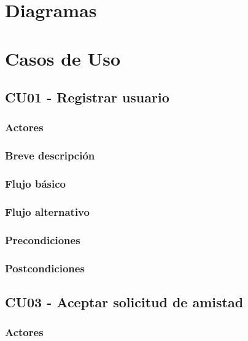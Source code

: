 \documentclass[12pt, a4paper, titlepage]{article}
\begin{document}
\section{Diagramas}




\section{Casos de Uso}

\subsection{CU01 - Registrar usuario}
\subsubsection{Actores}
\subsubsection{Breve descripción}
\subsubsection{Flujo básico}
\subsubsection{Flujo alternativo}
\subsubsection{Precondiciones}
\subsubsection{Postcondiciones}


\subsection{CU03 - Aceptar solicitud de amistad}
\subsubsection{Actores}
\end{document}
